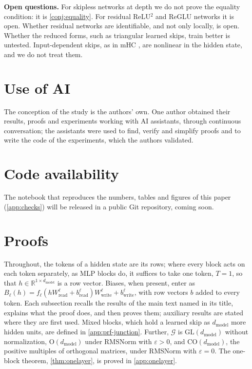 \documentclass[10pt]{article}
\theoremstyle{definition}
\theoremstyle{remark}
\newcommand{\R}{\mathbb{R}}
\newcommand{\Wread}{W_{\mathrm{read}}}
\newcommand{\Wwrite}{W_{\mathrm{write}}}
\newcommand{\dm}{d_{\mathrm{model}}}
\newcommand{\GL}{\mathrm{GL}}
\newcommand{\Ort}{\mathrm{O}}
\newcommand{\CO}{\mathrm{CO}}
\newcommand{\G}{\mathcal{G}}
\newcommand{\para}[1]{\smallskip\noindent\textbf{#1}\hspace{0.5em}}
\begin{document}
\para{Open questions.} For skipless networks at depth we do not prove the equality condition: it is \cref{conj:equality}. For residual ReLU$^2$ and ReGLU networks it is open. Whether residual networks are identifiable, and not only locally, is open. Whether the reduced forms, such as triangular learned skips, train better is untested. Input-dependent skips, as in mHC \citep{xie2025mhc}, are nonlinear in the hidden state, and we do not treat them.

\section*{Use of AI}
The conception of the study is the authors' own. One author obtained their results, proofs and experiments working with AI assistants, through continuous conversation; the assistants were used to find, verify and simplify proofs and to write the code of the experiments, which the authors validated.

\section*{Code availability}
The notebook that reproduces the numbers, tables and figures of this paper (\cref{app:checks}) will be released in a public Git repository, coming soon.





\appendix
\section{Proofs}\label{app:proofs}

Throughout, the tokens of a hidden state are its rows; where every block acts on each token separately, as MLP blocks do, it suffices to take one token, $T = 1$, so that $h \in \R^{1\times\dm}$ is a row vector. Biases, when present, enter as $B_\ell(h) = f_\ell(h\Wread^{\ell} + b^{\ell}_{\mathrm{read}})\Wwrite^{\ell} + b^{\ell}_{\mathrm{write}}$, with row vectors $b$ added to every token. Each subsection recalls the results of the main text named in its title, explains what the proof does, and then proves them; auxiliary results are stated where they are first used. Mixed blocks, which hold a learned skip as $\dm$ more hidden units, are defined in \cref{app:prf-junction}. Further, $\G$ is $\GL(\dm)$ without normalization, $\Ort(\dm)$ under RMSNorm with $\varepsilon > 0$, and $\CO(\dm)$, the positive multiples of orthogonal matrices, under RMSNorm with $\varepsilon = 0$. The one-block theorem, \cref{thm:onelayer}, is proved in \cref{app:onelayer}.
\end{document}
